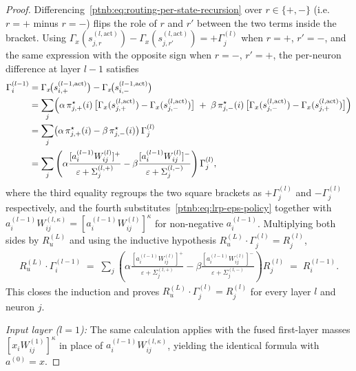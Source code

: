 \begin{proof}
Differencing~\eqref{ptnb:eq:routing-per-state-recursion} over $r \in \{+,-\}$ (i.e.\ $r{=}+$ minus
$r{=}-$) flips the role of $r$ and $r'$ between the two terms inside the bracket. Using
$\Gamma_x(s_{j,r}^{(l,\mathrm{act})}) - \Gamma_x(s_{j,r'}^{(l,\mathrm{act})}) = +\Gamma^{(l)}_j$
when $r{=}+$, $r'{=}-$, and the same expression with the opposite sign when $r{=}-$, $r'{=}+$, the
per-neuron difference at layer $l-1$ satisfies
\begin{align}
    \Gamma^{(l-1)}_i
    &=
    \Gamma_x\!\bigl(s_{i,+}^{(l-1, \mathrm{act})}\bigr) - \Gamma_x\!\bigl(s_{i,-}^{(l-1,
    \mathrm{act})}\bigr) \nonumber \\
    &=
    \sum_j \Bigl(
    \alpha\, \pi_{j,+}^\star(i)\, \bigl[\Gamma_x(s_{j,+}^{(l,\mathrm{act})}) -
    \Gamma_x(s_{j,-}^{(l,\mathrm{act})})\bigr]
    \;+\;
    \beta\, \pi_{j,-}^\star(i)\, \bigl[\Gamma_x(s_{j,-}^{(l,\mathrm{act})}) -
    \Gamma_x(s_{j,+}^{(l,\mathrm{act})})\bigr]
    \Bigr) \nonumber \\
    &=
    \sum_j \bigl(\alpha\, \pi_{j,+}^\star(i) - \beta\, \pi_{j,-}^\star(i)\bigr)\, \Gamma^{(l)}_j
    \nonumber \\
    &=
    \sum_j \left(
    \alpha \frac{[a_i^{(l-1)} W_{ij}^{(l)}]^+}{\varepsilon + \Sigma_j^{(l,+)}}
    -
    \beta \frac{[a_i^{(l-1)} W_{ij}^{(l)}]^-}{\varepsilon + \Sigma_j^{(l,-)}}
    \right) \Gamma^{(l)}_j,
\end{align}
where the third equality regroups the two square brackets as $+\Gamma^{(l)}_j$ and
$-\Gamma^{(l)}_j$ respectively, and the fourth substitutes~\eqref{ptnb:eq:lrp-eps-policy} together with
$a_i^{(l-1)} W_{ij}^{(l,\kappa)} = [a_i^{(l-1)} W_{ij}^{(l)}]^\kappa$ for non-negative
$a_i^{(l-1)}$. Multiplying both sides by $R_u^{(L)}$ and using the inductive hypothesis $R_u^{(L)}
    \cdot \Gamma^{(l)}_j = R^{(l)}_j$,
\begin{align}
    R_u^{(L)} \cdot \Gamma^{(l-1)}_i
    \;=\; \sum_j \left(
    \alpha \frac{[a_i^{(l-1)} W_{ij}^{(l)}]^+}{\varepsilon + \Sigma_j^{(l,+)}}
    -
    \beta \frac{[a_i^{(l-1)} W_{ij}^{(l)}]^-}{\varepsilon + \Sigma_j^{(l,-)}}
    \right) R^{(l)}_j
    \;=\; R^{(l-1)}_i.
\end{align}
This closes the induction and proves $R_u^{(L)} \cdot \Gamma^{(l)}_j = R^{(l)}_j$ for every layer
$l$ and neuron $j$.

\emph{Input layer ($l = 1$):} The same calculation applies with the fused first-layer masses $[x_i
    W_{ij}^{(1)}]^\kappa$ in place of $a_i^{(l-1)} W_{ij}^{(l,\kappa)}$, yielding the identical formula
with $a^{(0)} = x$.


\end{proof}
